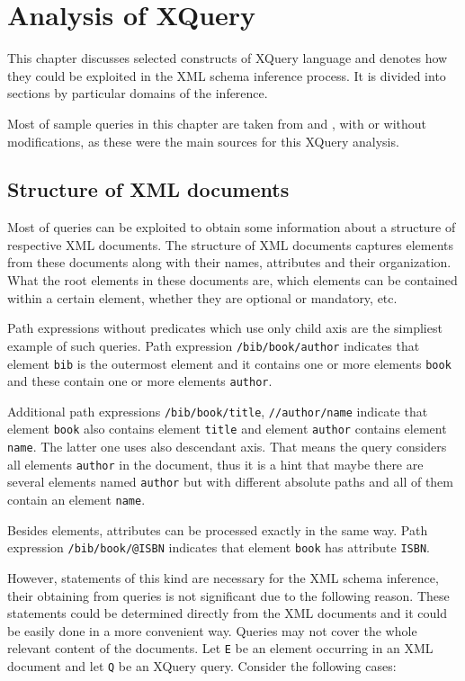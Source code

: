 \chapter{Analysis of XQuery}
This chapter discusses selected constructs of XQuery language and denotes how they could be exploited in the XML schema inference process. It is divided into sections by particular domains of the inference.

Most of sample queries in this chapter are taken from \cite{Walmsley:2007:XQU:1205865} and \cite{Marchiori:07:XQU}, with or without modifications, as these were the main sources for this XQuery analysis.

\section{Structure of XML documents}
Most of queries can be exploited to obtain some information about a structure of respective XML documents. The structure of XML documents captures elements from these documents along with their names, attributes and their organization. What the root elements in these documents are, which elements can be contained within a certain element, whether they are optional or mandatory, etc.

Path expressions without predicates which use only child axis are the simpliest example of such queries. Path expression \texttt{/bib/book/author} indicates that element \texttt{bib} is the outermost element and it contains one or more elements \texttt{book} and these contain one or more elements \texttt{author}.

Additional path expressions \texttt{/bib/book/title}, \texttt{//author/name} indicate that element \texttt{book} also contains element \texttt{title} and element \texttt{author} contains element \texttt{name}. The latter one uses also descendant axis. That means the query considers all elements \texttt{author} in the document, thus it is a hint that maybe there are several elements named \texttt{author} but with different absolute paths and all of them contain an element \texttt{name}.

Besides elements, attributes can be processed exactly in the same way. Path expression \texttt{/bib/book/@ISBN} indicates that element \texttt{book} has attribute \texttt{ISBN}.

However, statements of this kind are necessary for the XML schema inference, their obtaining from queries is not significant due to the following reason. These statements could be determined directly from the XML documents and it could be easily done in a more convenient way. Queries may not cover the whole relevant content of the documents. Let \texttt{E} be an element occurring in an XML document and let \texttt{Q} be an XQuery query. Consider the following cases:

